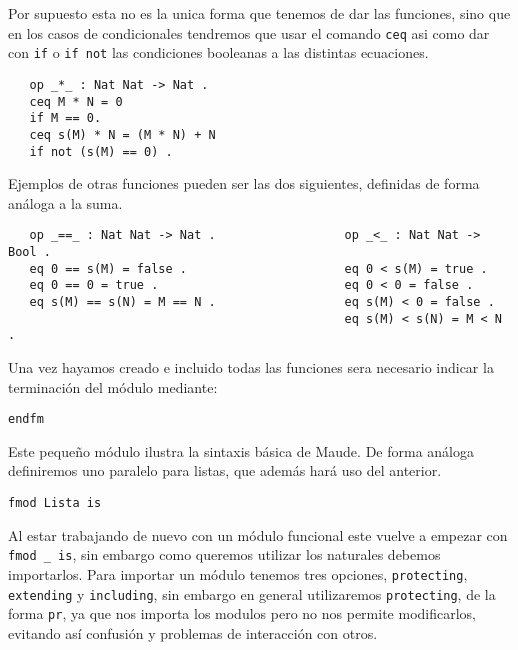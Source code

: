 Por supuesto esta no es la unica forma que tenemos de dar las funciones, sino que en los casos de condicionales tendremos que usar el comando \texttt{ceq} asi como dar con \texttt{if} o \texttt{if not} las condiciones booleanas a las distintas ecuaciones. \par

{\codesize
\begin{verbatim}
   op _*_ : Nat Nat -> Nat .
   ceq M * N = 0 
   if M == 0.
   ceq s(M) * N = (M * N) + N
   if not (s(M) == 0) .
\end{verbatim}
}

Ejemplos de otras funciones pueden ser las dos siguientes, definidas de forma análoga a la suma. \par

{\codesize
\begin{verbatim}
   op _==_ : Nat Nat -> Nat .                  op _<_ : Nat Nat -> Bool .
   eq 0 == s(M) = false .                      eq 0 < s(M) = true .
   eq 0 == 0 = true .                          eq 0 < 0 = false .
   eq s(M) == s(N) = M == N .                  eq s(M) < 0 = false .
                                               eq s(M) < s(N) = M < N .	

\end{verbatim}
}

Una vez hayamos creado e incluido todas las funciones sera necesario indicar la terminación del módulo mediante: \par

{\codesize
\begin{verbatim}
endfm
\end{verbatim}
}

Este pequeño módulo ilustra la sintaxis básica de Maude. De forma análoga definiremos uno paralelo para listas, que además hará uso del anterior. \par

{\codesize
\begin{verbatim}
fmod Lista is
\end{verbatim}
}
Al estar trabajando de nuevo con un módulo funcional este vuelve a empezar con \verb"fmod _ is", sin embargo como queremos utilizar los naturales debemos importarlos. Para importar un módulo tenemos tres opciones, \texttt{protecting}, \texttt{extending} y \texttt{including}, sin embargo en general utilizaremos \texttt{protecting}, de la forma \texttt{pr}, ya que nos importa los modulos pero no nos permite modificarlos, evitando así confusión y problemas de interacción con otros. \par

